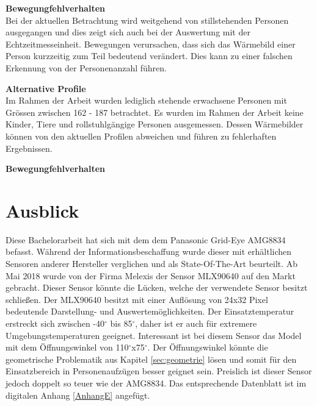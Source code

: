 \textbf{Bewegungfehlverhalten}\\
Bei der aktuellen Betrachtung wird weitgehend von stillstehenden Personen ausgegangen und dies zeigt sich auch bei der Auswertung mit der Echtzeitmesseinheit. Bewegungen verursachen, dass sich das Wärmebild einer Person kurzzeitig zum Teil bedeutend verändert. Dies kann zu einer falschen Erkennung von der Personenanzahl führen. 



\textbf{Alternative Profile}\\
Im Rahmen der Arbeit wurden lediglich stehende erwachsene Personen mit Grössen zwischen 162 - 187 betrachtet. Es wurden im Rahmen der Arbeit keine Kinder, Tiere und rollstuhlgängige Personen ausgemessen. Dessen Wärmebilder können von den aktuellen Profilen abweichen und führen zu fehlerhaften Ergebnissen.

\textbf{Bewegungfehlverhalten}\\

\section{Ausblick}

Diese Bachelorarbeit hat sich mit dem dem Panasonic Grid-Eye AMG8834 befasst. Während der Informationsbeschaffung wurde dieser mit erhältlichen Sensoren anderer Hersteller verglichen und als State-Of-The-Art beurteilt.  
Ab Mai 2018 wurde von der Firma Melexis der Sensor MLX90640 auf den Markt gebracht. Dieser Sensor könnte die Lücken, welche der verwendete Sensor besitzt schließen. Der MLX90640 besitzt mit einer Auflösung von 24x32 Pixel bedeutende Darstellung- und Auswertemöglichkeiten. Der Einsatztemperatur erstreckt sich zwischen -40$^\circ$ bis 85$^\circ$, daher ist er auch für extremere Umgebungstemperaturen geeignet. Interessant ist bei diesem Sensor das Model mit dem Öffnungswinkel von 110$^\circ$x75$^\circ$. Der Öffnungswinkel könnte die geometrische Problematik aus Kapitel \ref{sec:geometrie} lösen und somit für den Einsatzbereich in Personenaufzügen besser geignet sein. Preislich ist dieser Sensor jedoch doppelt so teuer wie der AMG8834. Das entsprechende Datenblatt ist im digitalen Anhang \ref{AnhangE} angefügt. 




